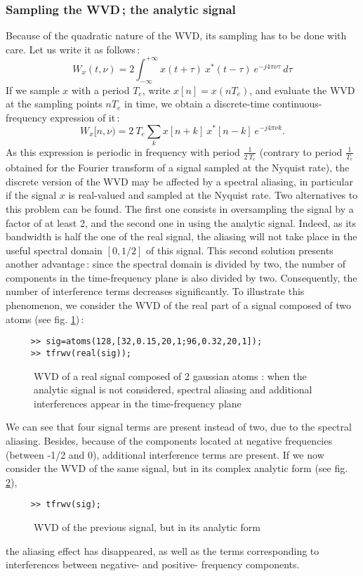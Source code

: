 \subsubsection{Sampling the WVD\,; the analytic signal} 
  Because of the quadratic nature of the WVD, its sampling has to be done
with care. Let us write it as follows\,:
\[W_x(t,\nu)=2\int_{-\infty}^{+\infty} x(t+\tau)\ x^*(t-\tau)\ e^{-j4\pi
\nu \tau}\ d\tau\] 
If we sample $x$ with a period $T_e$, write $x[n]=x(nT_e)$, and evaluate
the WVD at the sampling points $nT_e$ in time, we obtain a discrete-time
continuous-frequency expression of it\,:
\[W_x[n,\nu)=2\ T_e \sum_k x[n+k]\ x^*[n-k]\ e^{-j4\pi \nu k}.\]
As this expression is periodic in frequency with period $\frac{1}{2\ T_e}$
(contrary to period $\frac{1}{T_e}$ obtained for the Fourier transform of a
signal sampled at the Nyquist rate), the discrete version of the WVD may be
affected by a spectral aliasing, in particular if the signal $x$ is
real-valued and sampled at the Nyquist rate.  Two alternatives to this
problem can be found. The first one consists in oversampling the signal by
a factor of at least 2, and the second one in using the analytic
signal. Indeed, as its bandwidth is half the one of the real signal, the
aliasing will not take place in the useful spectral domain $[0,1/2]$ of
this signal. This second solution presents another advantage\,: since the
spectral domain is divided by two, the number of components in the
time-frequency plane is also divided by two. Consequently, the number of
interference terms decreases significantly. To illustrate this phenomenon,
we consider the WVD of the real part of a signal composed of two atoms (see
fig. \ref{En1fig6})\,:
\begin{verbatim}
     >> sig=atoms(128,[32,0.15,20,1;96,0.32,20,1]);
     >> tfrwv(real(sig));
\end{verbatim}
\begin{figure}[htb]
\epsfxsize=10cm
\epsfysize=8cm
\centerline{}
\caption{\label{En1fig6}WVD of a real signal composed of 2 gaussian atoms :
when the analytic signal is not considered, spectral aliasing and additional
interferences appear in the time-frequency plane}
\end{figure}
We can see that four signal terms are present instead of two, due to the
spectral aliasing. Besides, because of the components located at negative
frequencies (between -1/2 and 0), additional interference terms are
present. If we now consider the WVD of the same signal, but in its complex
analytic form (see fig. \ref{En1fig7}),
\begin{verbatim}
     >> tfrwv(sig);
\end{verbatim}
\begin{figure}[htb]
\epsfxsize=10cm
\epsfysize=8cm
\centerline{}
\caption{\label{En1fig7}WVD of the previous signal, but in its analytic
form}
\end{figure}
the aliasing effect has disappeared, as well as the terms corresponding to
interferences between negative- and positive- frequency components.


